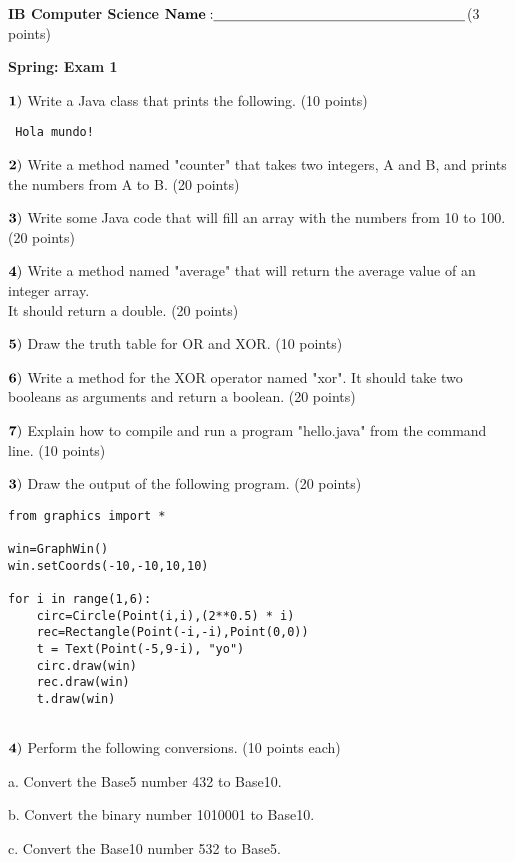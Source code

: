 \documentclass{article}
\begin{document}

\doublespacing
\textbf{IB Computer Science }                        %
 \hfill                             %
$ {\bf Name: } \underline{\hspace{2.5in}}$(3 points)

\begin{centering}
\vspace{1cm}
\textbf{Spring: Exam 1}\\
\end{centering}
\vspace{1cm}
 

  
 
 $\bf{1)}$ Write a Java class that prints the following. (10 points)
  
   \begin{verbatim}
 Hola mundo!
 \end{verbatim}
 
 $\bf{2)}$ Write a method named "counter" that takes two integers, A and B, and prints the numbers from A to B. (20 points)
  \vspace{0.5cm}
 
  $\bf{3)}$ Write some Java code that will fill an array with the numbers from 10 to 100.  (20 points)
   \vspace{0.5cm}
   
  $\bf{4)}$ Write a method named "average" that will return the average value of an integer array. \\
   It should return a double.  (20 points)
   \vspace{0.5cm}
   
  $\bf{5)}$ Draw the truth table for OR and XOR.  (10 points)
   \vspace{0.5cm}
   
  $\bf{6)}$ Write a method for the XOR operator named "xor".  It should take two booleans as arguments and return a boolean.  (20 points)
   \vspace{0.5cm}
   
   $\bf{7)}$ Explain how to compile and run a program "hello.java" from the command line.  (10 points)
  


  
  
  
    \newpage
  
  $\bf{3)}$  Draw the output of the following program. (20 points)
  \begin{verbatim}
from graphics import *

win=GraphWin()
win.setCoords(-10,-10,10,10)

for i in range(1,6):
    circ=Circle(Point(i,i),(2**0.5) * i)
    rec=Rectangle(Point(-i,-i),Point(0,0))
    t = Text(Point(-5,9-i), "yo")
    circ.draw(win)
    rec.draw(win)
    t.draw(win)
    
    \end{verbatim}
    
   
  \newpage
  
  $\bf{4)}$ Perform the following conversions. (10 points each)
  \vspace{0.5cm}
  
   a. Convert the Base5 number 432 to Base10. 
  
  b. Convert the binary number 1010001 to Base10. 
  
  c. Convert the Base10 number 532 to Base5.
  
  

 
\end{document}
